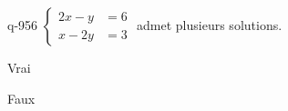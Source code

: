 \begin{truefalse}{q-956}
$\begin{cases}2x-y &= 6 \\ x-2y &= 3\end{cases}$ admet plusieurs solutions.
\item Vrai
\item* Faux
\end{truefalse}

